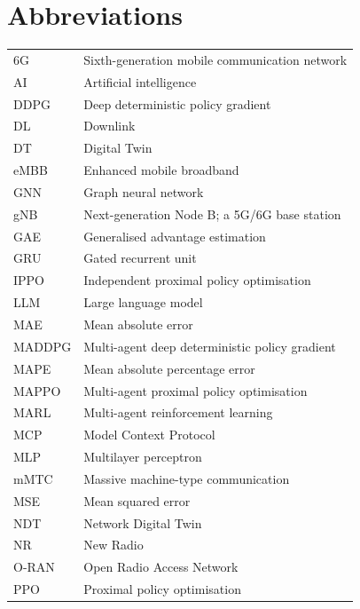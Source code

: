 
\section*{{\huge Abbreviations}\hfill}
\vspace{0.5cm}

\begin{longtable}{p{3.2cm} p{11cm}}
6G & Sixth-generation mobile communication network \\
AI & Artificial intelligence \\
DDPG & Deep deterministic policy gradient \\
DL & Downlink \\
DT & Digital Twin \\
eMBB & Enhanced mobile broadband \\
GNN & Graph neural network \\
gNB & Next-generation Node B; a 5G/6G base station \\
GAE & Generalised advantage estimation \\
GRU & Gated recurrent unit \\
IPPO & Independent proximal policy optimisation \\
LLM & Large language model \\
MAE & Mean absolute error \\
MADDPG & Multi-agent deep deterministic policy gradient \\
MAPE & Mean absolute percentage error \\
MAPPO & Multi-agent proximal policy optimisation \\
MARL & Multi-agent reinforcement learning \\
MCP & Model Context Protocol \\
MLP & Multilayer perceptron \\
mMTC & Massive machine-type communication \\
MSE & Mean squared error \\
NDT & Network Digital Twin \\
NR & New Radio \\
O-RAN & Open Radio Access Network \\
PPO & Proximal policy optimisation \\

\end{longtable}
